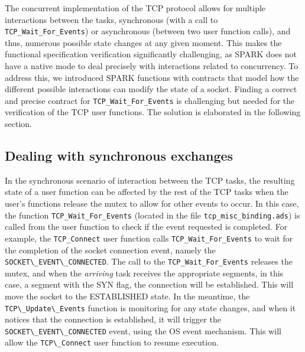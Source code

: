 \documentclass[conference]{IEEEtran}
\def\spark#1{\lstinline[language=Ada]{#1}}
\def\state#1{\textsf{\MakeUppercase{#1}}\xspace}
\def\sestab{\state{established}}
\def\flag#1{\textsf{#1}\xspace}
\def\syn{\flag{SYN}}
\begin{document}
The concurrent implementation of the TCP protocol allows for multiple interactions between the tasks, synchronous (with a call to \spark{TCP_Wait_For_Events}) or asynchronous (between two user function calls), and thus, numerous possible state changes at any given moment. This makes the functional specification verification significantly challenging, as SPARK does not have a native mode to deal precisely with interactions related to concurrency. To address this, we introduced SPARK functions with contracts that model how the different possible interactions can modify the state of a socket. Finding a correct and precise contract for \spark{TCP_Wait_For_Events} is challenging but needed for the verification of the TCP user functions. The solution is elaborated in the following section.


\subsection{Dealing with synchronous exchanges}


In the synchronous scenario of interaction between the TCP tasks, the resulting state of a user function can be affected by the rest of the TCP tasks when the user's functions release the mutex to allow for other events to occur. In this case, the function \spark{TCP_Wait_For_Events} (located in the file \texttt{tcp\_misc\_binding.ads}) is called from the user function to check if the event requested is completed. For example, the \spark{TCP_Connect} user function calls \spark{TCP_Wait_For_Events} to wait for the completion of the socket connection event, namely the \spark{SOCKET\_EVENT\_CONNECTED}. The call to the \spark{TCP_Wait_For_Events} releases the mutex, and when the \emph{arriving} task receives the appropriate segments, in this case, a segment with the \syn flag, the connection will be established. This will move the socket to the \sestab state. In the meantime, the \spark{TCP\_Update\_Events} function is monitoring for any state changes, and when it notices that the connection is established, it will trigger the \spark{SOCKET\_EVENT\_CONNECTED} event, using the OS event mechanism. This will allow the \spark{TCP\_Connect} user function to resume execution.



\end{document}
